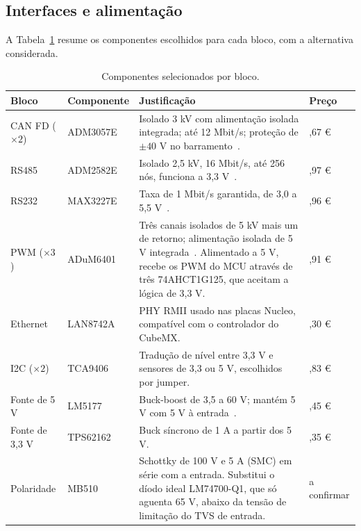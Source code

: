 \subsection{Interfaces e alimentação}

A Tabela~\ref{tab:proj-componentes} resume os componentes escolhidos para
cada bloco, com a alternativa considerada.

\begin{table}[htbp]
\centering\small{}
\renewcommand{\arraystretch}{1.15}
\caption{Componentes selecionados por bloco.}
\label{tab:proj-componentes}
\begin{tabularx}{\textwidth}{@{}>{\raggedright\arraybackslash}p{}>{\raggedright\arraybackslash}p{}>{\raggedright\arraybackslash}X>{\raggedright\arraybackslash}p{}@{}}
\toprule
\rowcolor{LasetTint}
Bloco & Componente & Justificação & Preço \\
\midrule
CAN FD ($\times2$) & ADM3057E & Isolado 3 kV com alimentação isolada integrada; até 12 Mbit/s; proteção de $\pm40$ V no barramento~\cite{adi_adm3057e}. & 13,67 € \\
RS485 & ADM2582E & Isolado 2,5 kV, 16 Mbit/s, até 256 nós, funciona a 3,3 V~\cite{adi_adm2582e}. & 13,97 € \\
RS232 & MAX3227E & Taxa de 1 Mbit/s garantida, de 3,0 a 5,5 V~\cite{maxim_max3227e}. & 5,96 € \\
PWM ($\times3$) & ADuM6401 & Três canais isolados de 5 kV mais um de retorno; alimentação isolada de 5 V integrada~\cite{adi_adum6401}. Alimentado a 5 V, recebe os PWM do MCU através de três 74AHCT1G125, que aceitam a lógica de 3,3 V. & 14,91 € \\
Ethernet & LAN8742A & PHY RMII usado nas placas Nucleo, compatível com o controlador do CubeMX. & 1,30 € \\
I2C ($\times2$) & TCA9406 & Tradução de nível entre 3,3 V e sensores de 3,3 ou 5 V, escolhidos por jumper. & 0,83 € \\
Fonte de 5 V & LM5177 & Buck-boost de 3,5 a 60 V; mantém 5 V com 5 V à entrada~\cite{ti_lm5177}. & 6,45 € \\
Fonte de 3,3 V & TPS62162 & Buck síncrono de 1 A a partir dos 5 V. & 1,35 € \\
Polaridade & MB510 & Schottky de 100 V e 5 A (SMC) em série com a entrada. Substitui o díodo ideal LM74700-Q1, que só aguenta 65 V, abaixo da tensão de limitação do TVS de entrada. & a confirmar \\
\bottomrule
\end{tabularx}
\end{table}

